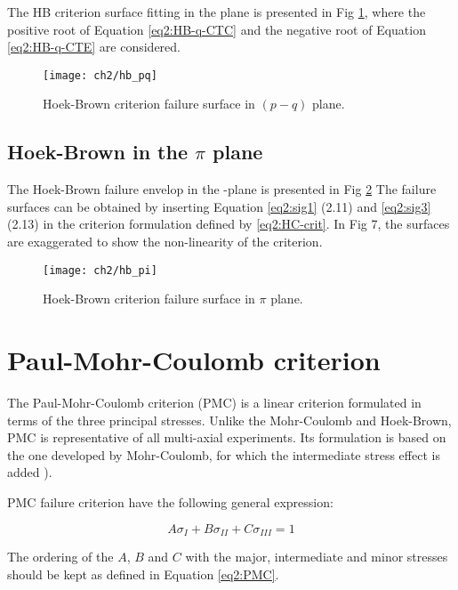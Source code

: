 The HB criterion surface fitting in the  plane is presented in Fig \ref{fig2:hb_pq}, where the positive root of Equation \ref{eq2:HB-q-CTC} and the negative root of Equation \ref{eq2:HB-q-CTE} are considered.

\begin{figure}[tb]
    \centering
    \texttt{[image: ch2/hb\_pq]}
    \caption{Hoek-Brown criterion failure surface in $(p-q)$ plane.}
    \label{fig2:hb_pq}
\end{figure} 

\subsection{Hoek-Brown in the \texorpdfstring{$\pi$}{pi} plane}

The Hoek-Brown failure envelop in the -plane is presented in Fig \ref{fig2:hb_pi} The failure surfaces can be obtained by inserting Equation \ref{eq2:sig1} (2.11) and \ref{eq2:sig3}  (2.13) in the criterion formulation defined by \ref{eq2:HC-crit}. In Fig 7, the surfaces are exaggerated to show the non-linearity of the criterion.  

\begin{figure}[tb]
    \centering
    \texttt{[image: ch2/hb\_pi]}
    \caption{Hoek-Brown criterion failure surface in $\pi$ plane.}
    \label{fig2:hb_pi}
\end{figure} 

\section{Paul-Mohr-Coulomb criterion}

The Paul-Mohr-Coulomb criterion (PMC) is a linear criterion formulated in terms of the three principal stresses. Unlike the Mohr-Coulomb and Hoek-Brown, PMC is representative of all multi-axial experiments. Its formulation is based on the one developed by Mohr-Coulomb, for which the intermediate stress effect is added \cite[Paul (1968)]{Paul1968}). 

PMC failure criterion have the following general expression:

\begin{equation}\label{eq2:PMC}
    A\sigma_I + B\sigma_{II}+C\sigma_{III} = 1
\end{equation}

The ordering of the $A$, $B$ and $C$ with the major, intermediate and minor stresses should be kept as defined in Equation \ref{eq2:PMC}. 

